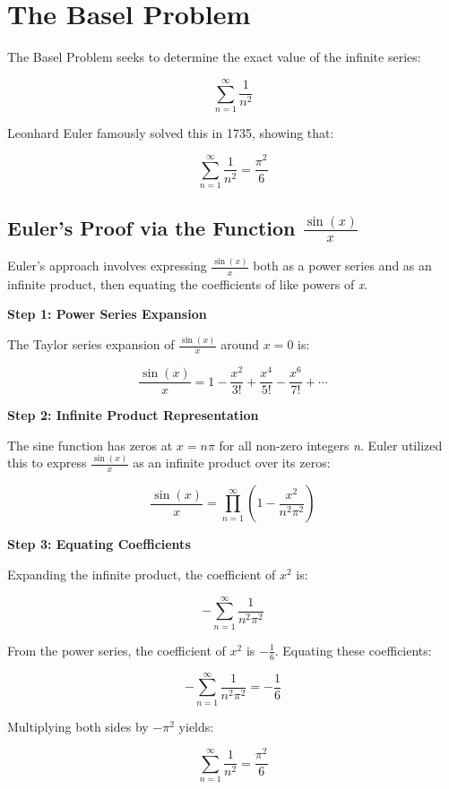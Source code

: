 \newpage
\section{The Basel Problem}

The Basel Problem seeks to determine the exact value of the infinite series:

\[
    \sum_{n=1}^{\infty} \frac{1}{n^2}
\]

Leonhard Euler famously solved this in 1735, showing that:

\[
    \sum_{n=1}^{\infty} \frac{1}{n^2} = \frac{\pi^2}{6}
\]

\subsection{Euler's Proof via the Function \( \frac{\sin(x)}{x} \)}

Euler's approach involves expressing \( \frac{\sin(x)}{x} \) both as a power series and as an 
infinite product, then equating the coefficients of like powers of \emph{x}.
\vspace{\baselineskip}

\textbf{Step 1: Power Series Expansion}

The Taylor series expansion of \( \frac{\sin(x)}{x} \) around \( x = 0 \) is:

\[
    \frac{\sin(x)}{x} = 1 - \frac{x^2}{3!} + \frac{x^4}{5!} - \frac{x^6}{7!} + \cdots
\]

\textbf{Step 2: Infinite Product Representation}

The sine function has zeros at \( x = n\pi \) for all non-zero integers \emph{n}. Euler utilized this to 
express \( \frac{\sin(x)}{x} \) as an infinite product over its zeros:

\[
    \frac{\sin(x)}{x} = \prod_{n=1}^{\infty} \left(1 - \frac{x^2}{n^2\pi^2}\right)
\]

\textbf{Step 3: Equating Coefficients}

Expanding the infinite product, the coefficient of \( x^2 \) is:

\[
    -\sum_{n=1}^{\infty} \frac{1}{n^2\pi^2}
\]

From the power series, the coefficient of \( x^2 \) is \( -\frac{1}{6} \). Equating these coefficients:

\[
    -\sum_{n=1}^{\infty} \frac{1}{n^2\pi^2} = -\frac{1}{6}
\]

Multiplying both sides by \( -\pi^2 \) yields:

\[
    \sum_{n=1}^{\infty} \frac{1}{n^2} = \frac{\pi^2}{6}
\]

